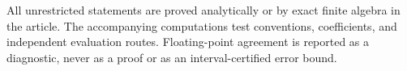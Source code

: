 All unrestricted statements are proved analytically or by exact finite
algebra in the article. The accompanying computations test conventions,
coefficients, and independent evaluation routes. Floating-point
agreement is reported as a diagnostic, never as a proof or as an
interval-certified error bound.
